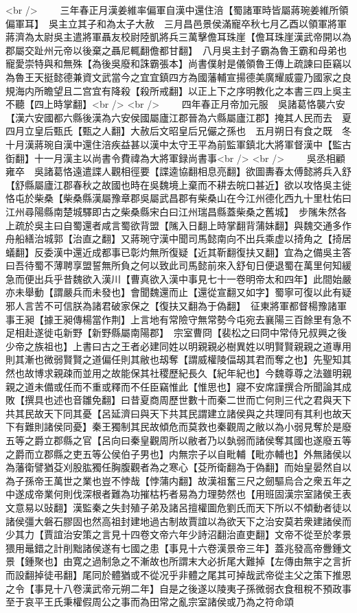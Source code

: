 <br />
　　三年春正月漢姜維率偏軍自漢中還住涪【蜀諸軍時皆屬蔣琬姜維所領偏軍耳】　吳主立其子和為太子大赦　三月昌邑景侯滿寵卒秋七月乙酉以領軍將軍蔣濟為太尉吳主遣將軍聶友校尉陸凱將兵三萬擊儋耳珠崖【儋耳珠崖漢武帝開以為郡屬交趾州元帝以後棄之聶尼輒翻儋都甘翻】　八月吳主封子霸為魯王霸和母弟也寵愛崇特與和無殊【為後吳廢和誅霸張本】尚書僕射是儀領魯王傳上疏諫曰臣竊以為魯王天挺懿德兼資文武當今之宜宜鎮四方為國藩輔宣揚德美廣耀威靈乃國家之良規海内所瞻望且二宫宜有降殺【殺所戒翻】以正上下之序明教化之本書三四上吳主不聽【四上時掌翻】<br />
<br />
　　四年春正月帝加元服　吳諸葛恪襲六安【漢六安國都六縣後漢為六安侯國屬廬江郡晉為六縣屬廬江郡】掩其人民而去　夏四月立皇后甄氏【甄之人翻】大赦后文昭皇后兄儼之孫也　五月朔日有食之既　冬十月漢蔣琬自漢中還住涪疾益甚以漢中太守王平為前監軍鎮北大將軍督漢中【監古衘翻】十一月漢主以尚書令費禕為大將軍録尚書事<br />
<br />
　　吳丞相顧雍卒　吳諸葛恪遠遣諜人觀相徑要【諜逵協翻相息亮翻】欲圖夀春太傅懿將兵入舒【舒縣屬廬江郡春秋之故國也時在吳魏境上棄而不耕去皖口甚近】欲以攻恪吳主徙恪屯於柴桑【柴桑縣漢屬豫章郡吳屬武昌郡有柴桑山在今江州德化西九十里杜佑曰江州尋陽縣南楚城驛即古之柴桑縣宋白曰江州瑞昌縣蓋柴桑之舊城】　步隲朱然各上疏於吳主曰自蜀還者咸言蜀欲背盟【隲入日翻上時掌翻背蒲妹翻】與魏交通多作舟船繕治城郭【治直之翻】又蔣琬守漢中聞司馬懿南向不出兵乘虚以掎角之【掎居蟻翻】反委漢中還近成都事已彰灼無所復疑【近其靳翻復扶又翻】宜為之備吳主答曰吾待蜀不薄聘享盟誓無所負之何以致此司馬懿前來入舒旬日便退蜀在萬里何知緩急而便出兵乎昔魏欲入漢川【曹真欲入漢中事見七十一卷明帝太和四年】此間始嚴亦未舉動【謂嚴兵而未發也】會聞魏還而止【還從宣翻又如字】蜀寧可復以此有疑邪人言苦不可信朕為諸君破家保之【復扶又翻為于偽翻】　征東將軍都督楊豫諸軍事王昶【據王昶傳楊當作荆】上言地有常險守無常勢今屯宛去襄陽三百餘里有急不足相赴遂徙屯新野【新野縣屬南陽郡】　宗室曹冏【裴松之曰冏中常侍兄叔興之後少帝之族祖也】上書曰古之王者必建同姓以明親親必樹異姓以明賢賢親親之道專用則其漸也微弱賢賢之道偏任則其敝也刼奪【謂威權陵偪刼其君而奪之也】先聖知其然也故博求親疎而並用之故能保其社稷歷紀長久【紀年紀也】今魏尊尊之法雖明親親之道未備或任而不重或釋而不任臣竊惟此【惟思也】寢不安席謹撰合所聞論其成敗【撰具也述也音雛免翻】曰昔夏商周歷世數十而秦二世而亡何則三代之君與天下共其民故天下同其憂【呂延濟曰與天下共其民謂建立諸侯與之共理同有其利也故天下有難則諸侯同憂】秦王獨制其民故傾危而莫救也秦觀周之敝以為小弱見奪於是廢五等之爵立郡縣之官【呂向曰秦皇觀周所以敝者乃以埶弱而諸侯奪其國也遂廢五等之爵而立郡縣之吏五等公侯伯子男也】内無宗子以自毗輔【毗亦輔也】外無諸侯以為藩衛譬猶芟刈股肱獨任胸腹觀者為之寒心【芟所衛翻為于偽翻】而始皇晏然自以為子孫帝王萬世之業也豈不悖哉【悖蒲内翻】故漢祖奮三尺之劒驅烏合之衆五年之中遂成帝業何則伐深根者難為功摧枯朽者易為力理勢然也【用班固漢宗室諸侯王表文意易以䜴翻】漢監秦之失封殖子弟及諸呂擅權圖危劉氏而天下所以不傾動者徒以諸侯彊大磐石膠固也然高祖封建地過古制故賈誼以為欲天下之治安莫若衆建諸侯而少其力【賈誼治安策之言見十四卷文帝六年少詩沼翻治直吏翻】文帝不從至於孝景猥用鼂錯之計削黜諸侯遂有七國之患【事見十六卷漢景帝三年】蓋兆發高帝釁鍾文景【鍾聚也】由寛之過制急之不漸故也所謂末大必折尾大難掉【左傳由無宇之言折而設翻掉徒弔翻】尾同於體猶或不從况乎非體之尾其可掉哉武帝從主父之策下推恩之令【事見十八卷漢武帝元朔二年】自是之後遂以陵夷子孫微弱衣食租稅不預政事至于哀平王氏秉權假周公之事而為田常之亂宗室諸侯或乃為之符命頌